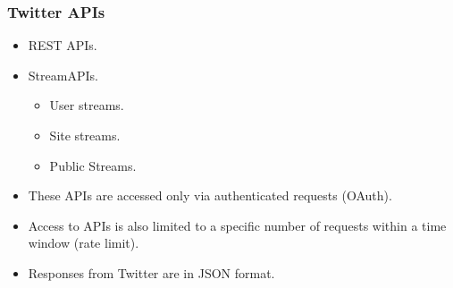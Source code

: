 \documentclass[hyperref={pdfpagelabels=true}]{beamer}
\begin{document}
\begin{frame}
\frametitle{Twitter APIs}

\begin{itemize}
  \item<2->REST APIs. %
  \item<3->StreamAPIs. %
  \begin{itemize}  
    \item<4->User streams. %
    \item<5->Site streams. %
    \item<6->Public Streams. %
  \end{itemize}  
  \item<7->These APIs are accessed only via authenticated requests (OAuth).%
  \item<8->Access to APIs is also limited to a specific number of requests within a time window (rate limit). %
  \item<9->Responses from Twitter are in JSON format.
\end{itemize}  

\end{frame}
\end{document}
